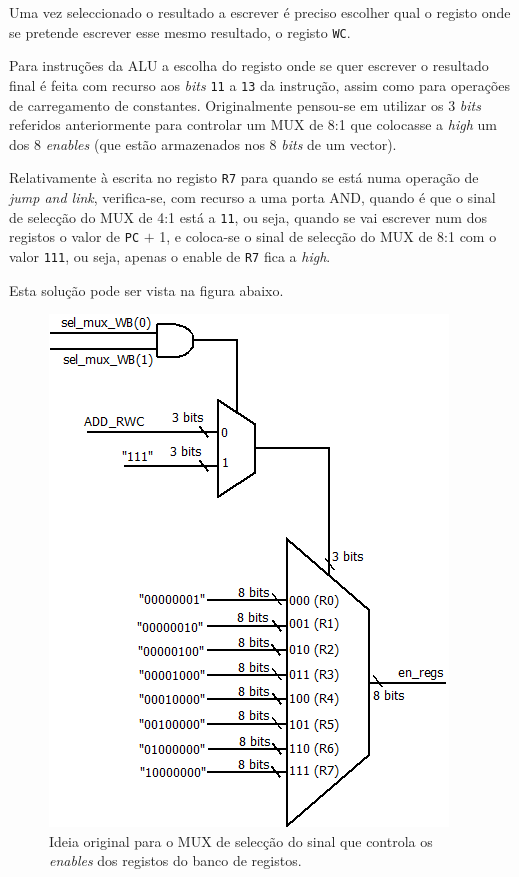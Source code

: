 \documentclass[11pt]{article}
\numberwithin{equation}{section}
\begin{document}
Uma vez seleccionado o resultado a escrever é preciso escolher qual o registo onde se pretende escrever esse mesmo resultado, o registo \texttt{WC}. 

Para instruções da ALU a escolha do registo onde se quer escrever o resultado final é feita com recurso aos \textit{bits} \texttt{11} a \texttt{13} da instrução, assim como para operações de carregamento de constantes. Originalmente pensou-se em utilizar os 3 \textit{bits} referidos anteriormente para controlar um MUX de 8:1 que colocasse a \textit{high} um dos 8 \textit{enables} (que estão armazenados nos 8 \textit{bits} de um vector).

Relativamente à escrita no registo \texttt{R7} para quando se está numa operação de \textit{jump and link}, verifica-se, com recurso a uma porta AND, quando é que o sinal de selecção do MUX de 4:1 está a \texttt{11}, ou seja, quando se vai escrever num dos registos o valor de \texttt{PC} $+$ 1, e coloca-se o sinal de selecção do MUX de 8:1 com o valor \texttt{111}, ou seja, apenas o enable de \texttt{R7} fica a \textit{high}.

Esta solução pode ser vista na figura abaixo.

\begin{figure}[h]
	\centering
	\includegraphics[keepaspectratio=true, scale=0.35]{imagens/WB2}
	\caption{Ideia original para o MUX de selecção do sinal que controla os \textit{enables} dos registos do banco de registos.}
	\vspace{-0.8em}
\end{figure}
\end{document}
